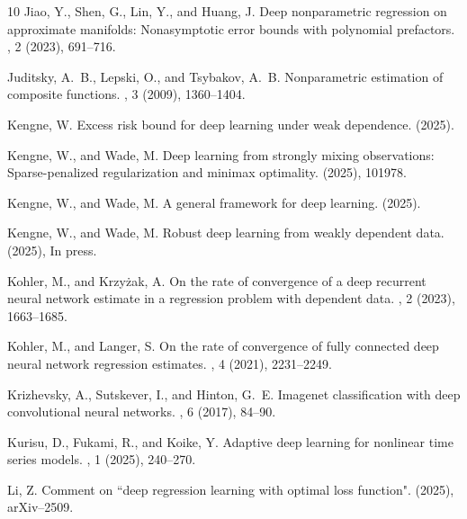 \documentclass[10pt,twoside]{article}
\numberwithin{equation}{section}
\begin{document}
\begin{thebibliography}{10}
{\sc Jiao, Y., Shen, G., Lin, Y., and Huang, J.}
\newblock Deep nonparametric regression on approximate manifolds: Nonasymptotic
  error bounds with polynomial prefactors.
, 2 (2023), 691--716.

{\sc Juditsky, A.~B., Lepski, O., and Tsybakov, A.~B.}
\newblock Nonparametric estimation of composite functions.
, 3 (2009), 1360--1404.

{\sc Kengne, W.}
\newblock Excess risk bound for deep learning under weak dependence.
 (2025).

{\sc Kengne, W., and Wade, M.}
\newblock Deep learning from strongly mixing observations: Sparse-penalized
  regularization and minimax optimality.
 (2025), 101978.

{\sc Kengne, W., and Wade, M.}
\newblock A general framework for deep learning.
 (2025).

{\sc Kengne, W., and Wade, M.}
\newblock Robust deep learning from weakly dependent data.
 (2025), In press.

{\sc Kohler, M., and Krzy{\.z}ak, A.}
\newblock On the rate of convergence of a deep recurrent neural network
  estimate in a regression problem with dependent data.
, 2 (2023), 1663--1685.

{\sc Kohler, M., and Langer, S.}
\newblock On the rate of convergence of fully connected deep neural network
  regression estimates.
, 4 (2021), 2231--2249.

{\sc Krizhevsky, A., Sutskever, I., and Hinton, G.~E.}
\newblock Imagenet classification with deep convolutional neural networks.
, 6 (2017), 84--90.

{\sc Kurisu, D., Fukami, R., and Koike, Y.}
\newblock Adaptive deep learning for nonlinear time series models.
, 1 (2025), 240--270.

{\sc Li, Z.}
\newblock Comment on ``deep regression learning with optimal loss function".
 (2025), arXiv--2509.


\end{thebibliography}
\end{document}
